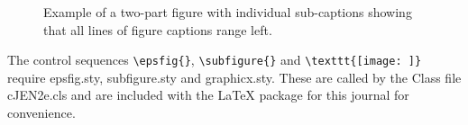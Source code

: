 \documentclass[]{cJEN2e}
\begin{document}
\begin{figure}
\begin{center}
\vspace{36pt}
\begin{minipage}{100mm}
%
%
\caption{Example of a two-part figure with individual %
sub-captions showing that all lines of figure captions range left.}%
\label{sample-figure}
\end{minipage}
\end{center}
\end{figure}

The control sequences \verb"\epsfig{}", \verb"\subfigure{}" and \verb"\texttt{[image: ]}" require epsfig.sty,
subfigure.sty and graphicx.sty. These are called by the Class file cJEN2e.cls and are included with the LaTeX
package for this journal for convenience.
\end{document}
